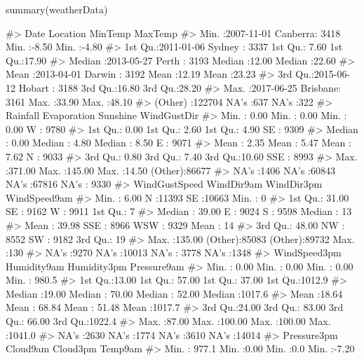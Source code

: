 \begin{Schunk}
\begin{Sinput}
summary(weatherData)
\end{Sinput}
\begin{Soutput}
#>       Date                Location         MinTemp         MaxTemp     
#>  Min.   :2007-11-01   Canberra:  3418   Min.   :-8.50   Min.   :-4.80  
#>  1st Qu.:2011-01-06   Sydney  :  3337   1st Qu.: 7.60   1st Qu.:17.90  
#>  Median :2013-05-27   Perth   :  3193   Median :12.00   Median :22.60  
#>  Mean   :2013-04-01   Darwin  :  3192   Mean   :12.19   Mean   :23.23  
#>  3rd Qu.:2015-06-12   Hobart  :  3188   3rd Qu.:16.80   3rd Qu.:28.20  
#>  Max.   :2017-06-25   Brisbane:  3161   Max.   :33.90   Max.   :48.10  
#>                       (Other) :122704   NA's   :637     NA's   :322    
#>     Rainfall       Evaporation        Sunshine      WindGustDir   
#>  Min.   :  0.00   Min.   :  0.00   Min.   : 0.00   W      : 9780  
#>  1st Qu.:  0.00   1st Qu.:  2.60   1st Qu.: 4.90   SE     : 9309  
#>  Median :  0.00   Median :  4.80   Median : 8.50   E      : 9071  
#>  Mean   :  2.35   Mean   :  5.47   Mean   : 7.62   N      : 9033  
#>  3rd Qu.:  0.80   3rd Qu.:  7.40   3rd Qu.:10.60   SSE    : 8993  
#>  Max.   :371.00   Max.   :145.00   Max.   :14.50   (Other):86677  
#>  NA's   :1406     NA's   :60843    NA's   :67816   NA's   : 9330  
#>  WindGustSpeed      WindDir9am      WindDir3pm     WindSpeed9am 
#>  Min.   :  6.00   N      :11393   SE     :10663   Min.   :  0   
#>  1st Qu.: 31.00   SE     : 9162   W      : 9911   1st Qu.:  7   
#>  Median : 39.00   E      : 9024   S      : 9598   Median : 13   
#>  Mean   : 39.98   SSE    : 8966   WSW    : 9329   Mean   : 14   
#>  3rd Qu.: 48.00   NW     : 8552   SW     : 9182   3rd Qu.: 19   
#>  Max.   :135.00   (Other):85083   (Other):89732   Max.   :130   
#>  NA's   :9270     NA's   :10013   NA's   : 3778   NA's   :1348  
#>   WindSpeed3pm    Humidity9am      Humidity3pm      Pressure9am    
#>  Min.   : 0.00   Min.   :  0.00   Min.   :  0.00   Min.   : 980.5  
#>  1st Qu.:13.00   1st Qu.: 57.00   1st Qu.: 37.00   1st Qu.:1012.9  
#>  Median :19.00   Median : 70.00   Median : 52.00   Median :1017.6  
#>  Mean   :18.64   Mean   : 68.84   Mean   : 51.48   Mean   :1017.7  
#>  3rd Qu.:24.00   3rd Qu.: 83.00   3rd Qu.: 66.00   3rd Qu.:1022.4  
#>  Max.   :87.00   Max.   :100.00   Max.   :100.00   Max.   :1041.0  
#>  NA's   :2630    NA's   :1774     NA's   :3610     NA's   :14014   
#>   Pressure3pm        Cloud9am        Cloud3pm        Temp9am     
#>  Min.   : 977.1   Min.   :0.00    Min.   :0.0     Min.   :-7.20  

\end{Soutput}
\end{Schunk}
